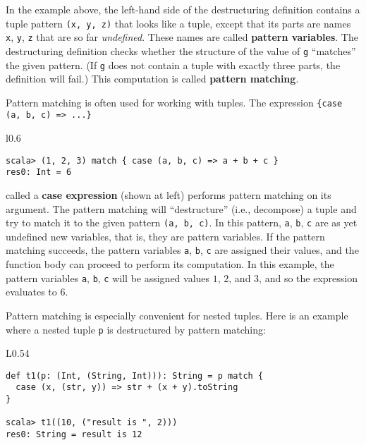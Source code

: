 In the example above, the left-hand side of the destructuring definition
contains a tuple pattern \lstinline!(x, y, z)! that looks like a
tuple, except that its parts are names \lstinline!x!, \lstinline!y!,
\lstinline!z! that are so far \emph{undefined}. These names are called
\textbf{pattern variables}. The destructuring
definition checks whether the structure of the value of \lstinline!g!
\textsf{``}matches\textsf{''} the given pattern. (If \lstinline!g! does not contain
a tuple with exactly three parts, the definition will fail.) This
computation is called \textbf{pattern matching}.

Pattern matching is often used for working with tuples. The expression
\lstinline!{case (a, b, c) => ...}!\begin{wrapfigure}{l}{0.6\columnwidth}%
\vspace{-0.7\baselineskip}
\begin{lstlisting}
scala> (1, 2, 3) match { case (a, b, c) => a + b + c }
res0: Int = 6
\end{lstlisting}
\vspace{-1.5\baselineskip}
\end{wrapfigure}%
called a \textbf{case expression}
(shown at left) performs pattern matching on its argument. The pattern
matching will \textsf{``}destructure\textsf{''} (i.e., decompose) a tuple and try
to match it to the given pattern \lstinline!(a, b, c)!. In this pattern,
\lstinline!a!, \lstinline!b!, \lstinline!c! are as yet undefined
new variables, \textemdash{} that is, they are pattern
variables. If the pattern matching succeeds, the pattern variables
\lstinline!a!, \lstinline!b!, \lstinline!c! are assigned their
values, and the function body can proceed to perform its computation.
In this example, the pattern variables \lstinline!a!, \lstinline!b!,
\lstinline!c! will be assigned values $1$, $2$, and $3$, and so
the expression evaluates to $6$.

Pattern matching is especially convenient for nested tuples. Here
is an example where a nested tuple \lstinline!p! is destructured
by pattern matching:\hfill{}~\begin{wrapfigure}{L}{0.54\columnwidth}%
\vspace{-0.8\baselineskip}
\begin{lstlisting}
def t1(p: (Int, (String, Int))): String = p match {
  case (x, (str, y)) => str + (x + y).toString
}

scala> t1((10, ("result is ", 2)))
res0: String = result is 12
\end{lstlisting}
\vspace{-1.5\baselineskip}
\end{wrapfigure}%
\textbf{ }

